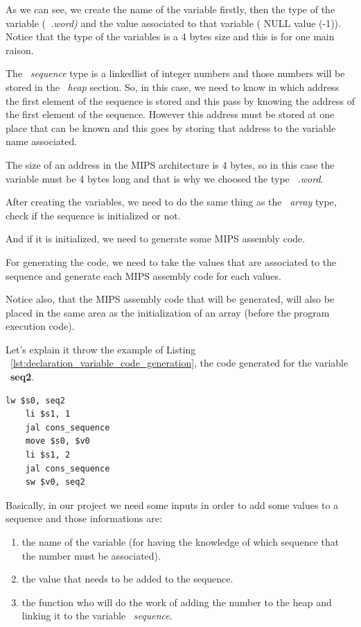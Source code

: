 \documentclass[
  oneside,
  11pt, a4paper,
  footinclude=true,
  headinclude=true,
  cleardoublepage=empty
]{scrbook}
\begin{document}
As we can see, we create the name of the variable firstly, then the type of the variable (~\textit{.word)} and the value associated to that variable ( NULL value (-1)). Notice that the type of the variables is a 4 bytes size and this is for one main raison.

The ~\textit{sequence} type is a linkedlist of integer numbers and those numbers will be stored in the ~\textit{heap} section.
So, in this case, we need to know in which address the first element of the sequence is stored and this pass by knowing the address of the first element of the sequence. However this address must be stored at one place that can be known and this goes by storing that address to the variable name associated.

The size of an address in the MIPS architecture is 4 bytes, so in this case the variable must be 4 bytes long and that is why we choosed the type ~\textit{.word}.

After creating the variables, we need to do the same thing as the ~\textit{array} type, check if the sequence is initialized or not.

And if it is initialized, we need to generate some MIPS assembly code. 

For generating the code, we need to take the values that are associated to the sequence and generate each MIPS assembly code for each values.

Notice also, that the MIPS assembly code that will be generated, will also be placed in the same area as the initialization of an array (before the program execution code).

Let's explain it throw the example of Listing ~\ref{lst:declaration_variable_code_generation}, the code generated for the variable ~\textbf{seq2}.

\begin{lstlisting}[caption={Code generated for the sequence variable},label={lst:sequence_initialization_mips}]
 	lw $s0, seq2		
	li $s1, 1		
	jal cons_sequence		
	move $s0, $v0		
	li $s1, 2		
	jal cons_sequence		
	sw $v0, seq2		
\end{lstlisting}

Basically, in our project we need some  inputs in order to add some values to a sequence and those informations are:
\begin{enumerate}
\item the name of the variable (for having the knowledge of which sequence that the number must be associated).
\item the value that needs to be added to the sequence.
\item the function who will do the work of adding the number to the heap and linking it to the variable ~\textit{sequence}.
\end{enumerate}
\end{document}
